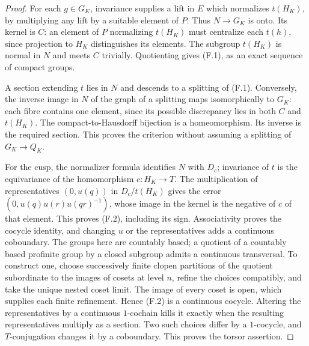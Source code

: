 \begin{proof}
For each $g\in G_K$, invariance supplies a lift in $E$ which
normalizes $t(H_K)$, by multiplying any lift by a suitable element
of $P$. Thus $N\to G_K$ is onto. Its kernel is $C$: an element of
$P$ normalizing $t(H_K)$ must centralize each $t(h)$, since
projection to $H_K$ distinguishes its elements. The subgroup
$t(H_K)$ is normal in $N$ and meets $C$ trivially. Quotienting
gives (F.1), as an exact sequence of compact groups.

A section extending $t$ lies in $N$ and descends to a splitting
of (F.1). Conversely, the inverse image in $N$ of the graph of a
splitting maps isomorphically to $G_K$: each fibre contains one
element, since its possible discrepancy lies in both $C$ and
$t(H_K)$. The compact-to-Hausdorff bijection is a homeomorphism.
Its inverse is the required section. This proves the criterion
without assuming a splitting of $G_K\to Q_K$.

For the cusp, the normalizer formula identifies $N$ with $D_c$;
invariance of $t$ is the equivariance of the homomorphism
$c:H_K\to T$. The multiplication of representatives
$(0,u(q))$ in $D_c/t(H_K)$ gives the error
$(0,u(q)u(r)u(qr)^{-1})$, whose image in the kernel is the negative
of $c$ of that element. This proves (F.2), including its sign.
Associativity proves the cocycle identity, and changing $u$ or
the representatives adds a continuous coboundary. The groups here
are countably based; a quotient of a countably based profinite
group by a closed subgroup admits a continuous transversal. To
construct one, choose successively finite clopen partitions of
the quotient subordinate to the images of cosets at level $n$,
refine the choices compatibly, and take the unique nested coset
limit. The image of every coset is open, which supplies each
finite refinement. Hence (F.2) is a continuous cocycle. Altering
the representatives by a continuous $1$-cochain kills it exactly
when the resulting representatives multiply as a section.
Two such choices differ by a $1$-cocycle, and $T$-conjugation
changes it by a coboundary. This proves the torsor assertion.
\end{proof}

